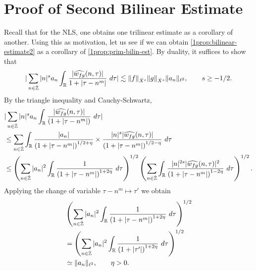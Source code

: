 \section{Proof of Second Bilinear Estimate}
Recall that for the NLS, one obtains one trilinear estimate as a corollary of
another. Using this as motivation, let us see if we can obtain
\cref{1prop:bilinear-estimate2} as a corollary of
\cref{1prop:prim-bilin-est}. By
duality, it suffices to show that
%
\begin{equation}
	\label{1duality-est}
	\begin{split}
	|	\sum_{n \in \dot{\mathbb{Z}}}  |n|^{s}
		a_n \int_{\mathbb{R}} \frac{|\widehat{w_{fg}}(n, \tau)|}{1 
		+ | \tau - n^m |} \ d \tau | \lesssim \|f\|_{\dot{X}^s} \|g\|_{\dot{X}^s}
		\|a_n \|_{\ell^2}, \qquad s \ge -1/2.
	\end{split}
\end{equation}
%
By the triangle inequality 
and Cauchy-Schwartz,
%
\begin{equation}
	\label{11m}
	\begin{split}
		& | \sum_{n \in \dot{\mathbb{Z}}} |n|^{s} a_n
		\int_{\mathbb{R}}\frac{| \widehat{w_{fg}}(n, \tau) |}{(1 + | \tau - n^m |)} \ d \tau |
		\\
		& \le \sum_{n \in \dot{\mathbb{Z}}} \int_{\mathbb{R}} \frac{| a_n |}{\left( 1 + 
		| \tau - n^m |
		\right)^{1/2 + \eta}} \times \frac{| n|^s  |
		\widehat{w_{fg}}(n, \tau) |}{\left( 
		1 + | \tau - n^m | \right)^{1/2 - \eta}} \ d \tau
		\\
		& \le \left( \sum_{n \in \dot{\mathbb{Z}}} | a_{n} |^2\int_{\mathbb{R}} \frac{1}{\left( 1 + |
		\tau - n^m | \right)^{1 + 2 \eta}} \ d \tau  
		\right)^{1/2} 
		\left ( \sum_{n \in \dot{\mathbb{Z}}}\int_{\mathbb{R}} \frac{|n|^{2s} | \widehat{w_{fg}}(n, \tau) 
		|^2}{\left( 1 + | \tau - n^m | \right)^{1 -2 \eta}}\ d \tau 
		\right)^{1/2}.
	\end{split}
\end{equation}
%
Applying the change of variable $\tau - n^m
\mapsto \tau'$ we obtain  
%
\begin{equation*}
	\begin{split}
		& \left( \sum_{n \in \zzdot} | a_{n} |^2\int_{\rr} \frac{1}{\left( 1 + | \tau -
		n^m | \right)^{1 + 2 \eta}} \ d \tau  
		\right)^{1/2} 
		\\
		& = \left ( \sum_{n \in \zzdot}
		| a_n |^2 
		\int_{\rr} \frac{1}{\left( 1 + | \tau' | \right)^{1 + 2 \eta}} \ d 
		\tau \right)^{1/2}
		\\
		& \simeq \|a_n\|_{\ell^2}, \qquad \eta >0.
		\end{split}
\end{equation*}
